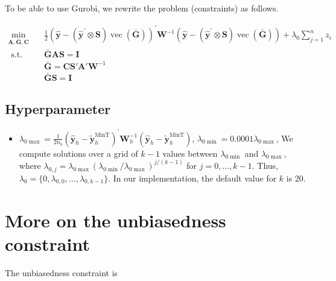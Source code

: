 \documentclass[
  letterpaper,
  DIV=11,
  numbers=noendperiod]{scrartcl}
\providecommand{\tightlist}{%
  \setlength{\itemsep}{0pt}\setlength{\parskip}{0pt}}\usepackage{longtable,booktabs,array}
\begin{document}
To be able to use Gurobi, we rewrite the problem (constraints) as
follows.

\[
\begin{aligned}
\min _{\boldsymbol{A},\bar{\boldsymbol{G}},\boldsymbol{C}} \quad & \frac{1}{2}\left(\hat{\boldsymbol{y}}-\left(\hat{\boldsymbol{y}}^{\prime} \otimes \boldsymbol{S}\right) \operatorname{vec}(\bar{\boldsymbol{G}})\right)^{\prime} \boldsymbol{W}^{-1}\left(\hat{\boldsymbol{y}}-\left(\hat{\boldsymbol{y}}^{\prime} \otimes \boldsymbol{S}\right) \operatorname{vec}(\bar{\boldsymbol{G}})\right) + \lambda_0 \sum_{j=1}^n z_i \\
\text { s.t. } \quad & 
\bar{\boldsymbol{G}}\boldsymbol{A}\boldsymbol{S} = \boldsymbol{I} \\
& \bar{\boldsymbol{G}} = \boldsymbol{C}\boldsymbol{S}'\boldsymbol{A}'\boldsymbol{W}^{-1} \\
& \bar{\boldsymbol{G}}\boldsymbol{S} = \boldsymbol{I}
\end{aligned}
\]

\hypertarget{hyperparameter-1}{%
\subsection{Hyperparameter}\label{hyperparameter-1}}

\begin{itemize}
\tightlist
\item
  \(\lambda_{0\max} = \frac{1}{2 n_b}\left(\hat{\boldsymbol{y}}_h-\tilde{\boldsymbol{y}}_h^{\text{MinT}}\right)^{\prime} \boldsymbol{W}_h^{-1}\left(\hat{\boldsymbol{y}}_h-\tilde{\boldsymbol{y}}_h^{\text{MinT}}\right)\),
  \(\lambda_{0\min} = 0.0001\lambda_{0\max}\), We compute solutions over
  a grid of \(k-1\) values between \(\lambda_{0\min }\) and
  \(\lambda_{0\max }\), where
  \(\lambda_{0, j}=\lambda_{0\max }\left(\lambda_{0\min } / \lambda_{0\max }\right)^{j / (k-1)}\)
  for \(j=0, \ldots, k-1\). Thus,
  \(\lambda_0=\{0, \lambda_{0,0}, \ldots, \lambda_{0,k-1}\}\). In our
  implementation, the default value for \(k\) is 20.
\end{itemize}

\hypertarget{more-on-the-unbiasedness-constraint}{%
\section{More on the unbiasedness
constraint}\label{more-on-the-unbiasedness-constraint}}

The unbiasedness constraint is
\end{document}
